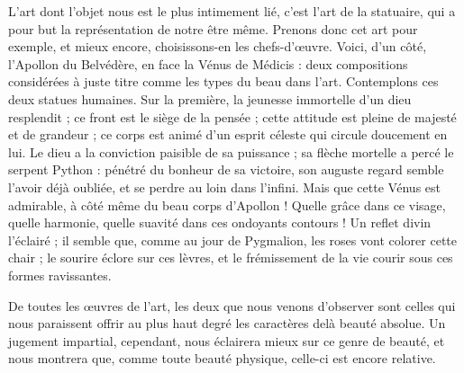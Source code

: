 \documentclass[a4paper, 11pt, oneside]{article}
\begin{document}
L'art dont l'objet nous est le plus intimement lié, c'est l'art de la statuaire, qui a pour but la représentation de notre être même. Prenons donc cet art pour exemple, et mieux encore, choisissons-en les chefs-d'œuvre. Voici, d'un côté, l'Apollon du Belvédère, en face la Vénus de Médicis : deux compositions considérées à juste titre comme les types du beau dans l'art. Contemplons ces deux statues humaines. Sur la première, la jeunesse immortelle d'un dieu resplendit ; ce front est le siège de la pensée ; cette attitude est pleine de majesté et de grandeur ; ce corps est animé d'un esprit céleste qui circule doucement en lui. Le dieu a la conviction paisible de sa puissance ; sa flèche mortelle a percé le serpent Python : pénétré du bonheur de sa victoire, son auguste regard semble l'avoir déjà oubliée, et se perdre au loin dans l'infini. Mais que cette Vénus est admirable, à côté même du beau corps d'Apollon ! Quelle grâce dans ce visage, quelle harmonie, quelle suavité dans ces ondoyants contours ! Un reflet divin l'éclairé ; il semble que, comme au jour de Pygmalion, les roses vont colorer cette chair ; le sourire éclore sur ces lèvres, et le frémissement de la vie courir sous ces formes ravissantes.

De toutes les œuvres de l'art, les deux que nous venons d'observer sont celles qui nous paraissent offrir au plus haut degré les caractères delà beauté absolue. Un jugement impartial, cependant, nous éclairera mieux sur ce genre de beauté, et nous montrera que, comme toute beauté physique, celle-ci est encore relative.
\end{document}
